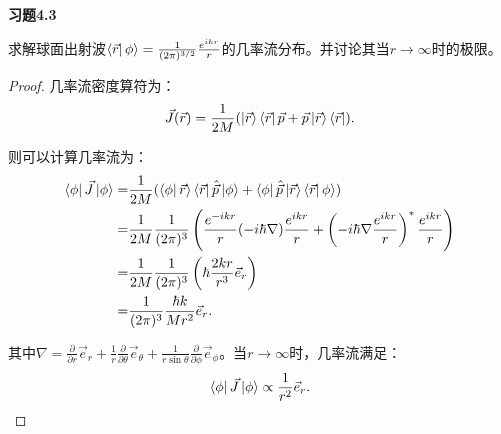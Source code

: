 \documentclass[reqno,a4paper,12pt]{amsart}
\begin{document}
\medskip

\textbf{习题4.3}

求解球面出射波$\bra{\vec{r}} \phi \rangle = \frac{1}{(2\pi)^{3/2}} \frac{e^{ikr}}{r}$的几率流分布。并讨论其当$r\to \infty$时的极限。

\begin{proof}
几率流密度算符为：
\[
	\vec{J}(\vec{r}) = \frac{1}{2M} (\ket{\vec{r}} \bra{\vec{r}} \vec{p} + \vec{p} \ket{\vec{r}} \bra{\vec{r}}).
\]

则可以计算几率流为：
\begin{align*}
	\bra{\phi} \vec{J} \ket{\phi} =& \frac{1}{2M} (\bra{\phi} \vec{r} \rangle \bra{\vec{r}} \hat{\vec{p}} \ket{\phi} + \bra{\phi} \hat{\vec{p}} \ket{\vec{r}} \bra{\vec{r}} \phi \rangle) \\
	=& \frac{1}{2M} \frac{1}{(2\pi)^3} \left( \frac{e^{-ikr}}{r} (-i\hbar\nabla) \frac{e^{ikr}}{r} + \left( -i\hbar\nabla \frac{e^{ikr}}{r} \right)^* \frac{e^{ikr}}{r} \right) \\
	=& \frac{1}{2M} \frac{1}{(2\pi)^3} \left( \hbar \frac{2kr}{r^3} \vec{e}_r \right) \\
	=& \frac{1}{(2\pi)^3} \frac{\hbar k}{Mr^2} \vec{e}_r.
\end{align*}

其中$\nabla = \frac{\partial}{\partial r} \vec{e}_r + \frac{1}{r}\frac{\partial}{\partial \theta} \vec{e}_\theta + \frac{1}{r\sin\theta} \frac{\partial}{\partial \phi} \vec{e}_\phi$。当$r\to\infty$时，几率流满足：
\[
	\bra{\phi} \vec{J} \ket{\phi} \propto \frac{1}{r^2} \vec{e}_r.
\]
\end{proof}
\end{document}
